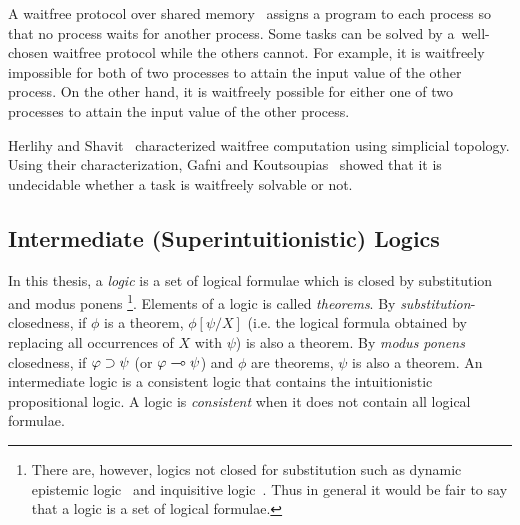A waitfree protocol over shared memory~\cite{herlihy1991wait}
 assigns a program to each process so that no process waits for another process.
Some tasks can be solved by a~well-chosen waitfree protocol while the others cannot.
For example,
 it is waitfreely impossible for both of two processes to attain the input value of the other
 process.
 On the other hand, it is waitfreely possible for
 either one of two processes to attain the input value of the other process.

Herlihy and Shavit~\cite{herlihy1999topological} characterized waitfree
computation using
simplicial topology.
Using their characterization,
Gafni and Koutsoupias~\cite{gafni1999three}
 showed that it is undecidable whether a task is waitfreely solvable
 or not.

\subsection{Intermediate (Superintuitionistic) Logics}

In this thesis,
a \textit{logic} is a set of logical formulae which is
closed by
substitution and modus ponens%
\footnote{There are, however, logics not closed for substitution such as
dynamic epistemic logic~\citep{ditmarsch2007dynamic} and
inquisitive logic~\citep{ciardelli2011}.  Thus
in general it would be fair to say that a logic is a set of logical
formulae.}.
Elements of a logic is called \textit{theorems}.
By \textit{substitution}-closedness, if $\phi$ is a
theorem, $\phi[\psi/X]$ (i.e. the
logical formula obtained by replacing all occurrences of $X$ with
$\psi$) is also a theorem.
By \textit{modus ponens} closedness, if
$\varphi\supset\psi$ (or $\varphi\multimap\psi$) and $\phi$ are
theorems, $\psi$ is also a theorem.
An intermediate logic is a consistent logic
that contains the intuitionistic propositional logic.  A logic is
\textit{consistent} when it does not
contain all logical formulae.

